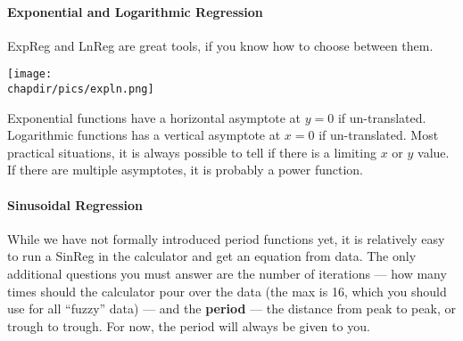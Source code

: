 \paragraph{Exponential and Logarithmic Regression}
ExpReg and LnReg are great tools, if you know how to choose between them.

\texttt{[image: \\chapdir/pics/expln.png]}

Exponential functions have a horizontal asymptote at $y=0$ if un-translated.  Logarithmic functions
has a vertical asymptote at $x=0$ if un-translated.  Most practical situations, it is always possible to tell if
there is a limiting $x$ or $y$ value.  If there are multiple asymptotes, it is probably a power function.

\paragraph{Sinusoidal Regression}
While we have not formally introduced period functions yet, it is relatively easy to run a SinReg in the calculator
and get an equation from data.  The only additional questions you must answer are the number of iterations ---
how many times should the calculator pour over the data (the max is 16, which you should use for all ``fuzzy''
data) --- and the \textbf{period} --- the distance from peak to peak, or trough to trough.  For now, the period will
always be given to you.
